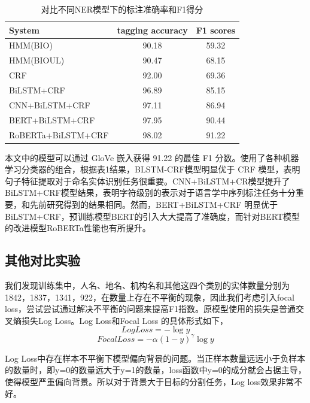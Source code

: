 \documentclass[a4paper, 12pt]{article}
\begin{document}
\begin{table}[htbp]
    \begin{center}
    \large 
    \begin{tabular}{lcc}
        \hline
         System & tagging accuracy & F1 scores \\   
        \hline
        
         HMM(BIO)           &       90.18 & 59.32          \\
         HMM(BIOUL)         &       90.47 & 68.15          \\
         CRF                &       92.00 & 69.36          \\
         BiLSTM+CRF         &       96.89 & 85.15        \\
         CNN+BiLSTM+CRF     &       97.11 & 86.94          \\
         BERT+BiLSTM+CRF    &       97.95 & 90.44         \\
         RoBERTa+BiLSTM+CRF &       98.02 & 91.22      \\
        \hline
    \end{tabular}
    \end{center}
    \caption {对比不同NER模型下的标注准确率和F1得分} 
\end{table}

本文中的模型可以通过 GloVe 嵌入获得 91.22 的最佳 F1 分数。使用了各种机器学习分类器的组合，根据表1结果，BLSTM-CRF模型明显优于 CRF 模型，表明句子特征提取对于命名实体识别任务很重要。CNN+BiLSTM+CR模型提升了BiLSTM+CRF模型结果，表明字符级别的表示对于语言学中序列标注任务十分重要，和先前研究得到的结果相同。然而，BERT+BiLSTM+CRF 明显优于 BiLSTM+CRF，预训练模型BERT的引入大大提高了准确度，而针对BERT模型的改进模型RoBERTa性能也有所提升。

\subsection{其他对比实验} %
\label{sub:loss}

我们发现训练集中，人名、地名、机构名和其他这四个类别的实体数量分别为1842，1837，1341，922，在数量上存在不平衡的现象，因此我们考虑引入focal loss，尝试尝试通过解决不平衡的问题来提高F1指数。原模型使用的损失是普通交叉熵损失Log Loss。Log Loss和Focal Loss 的具体形式如下，
$$Log Loss = -\log y$$
$$Focal Loss = -\alpha (1-y)^\gamma \log y$$

Log Loss中存在样本不平衡下模型偏向背景的问题。当正样本数量远远小于负样本的数量时，即y=0的数量远大于y=1的数量，loss函数中y=0的成分就会占据主导，使得模型严重偏向背景。所以对于背景大于目标的分割任务，Log loss效果非常不好。
\end{document}
